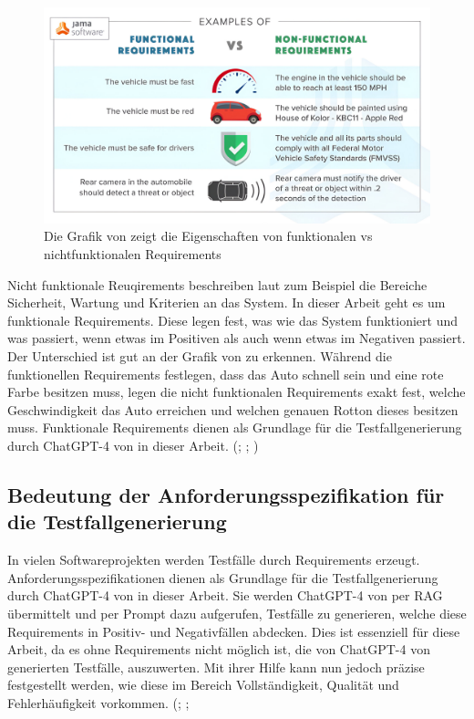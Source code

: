 \documentclass[12pt,toc=bib,toc=listof]{scrreprt}
\begin{document}
\begin{figure}[H]
    \centering
    \includegraphics[width=0.75\linewidth]{./Bilder/Jama Software_Eigenschaften von funktionalen vs nichtfunktionalen Requirements.jpeg}
    \caption{Die Grafik von \textcite{JamaSoftware2024} zeigt die Eigenschaften von funktionalen vs nichtfunktionalen Requirements}
    \label{fig:enter-label}
\end{figure}
\noindent Nicht funktionale Reuqirements beschreiben laut \textcite{Visure2024} zum Beispiel die Bereiche Sicherheit, Wartung und Kriterien an das System. In dieser Arbeit geht es um funktionale Requirements. Diese legen fest, was wie das System funktioniert und was passiert, wenn etwas im Positiven als auch wenn etwas im Negativen passiert. Der Unterschied ist gut an der Grafik von \textcite{JamaSoftware2024} zu erkennen. Während die funktionellen Requirements festlegen, dass das Auto schnell sein und eine rote Farbe besitzen muss, legen die nicht funktionalen Requirements exakt fest, welche Geschwindigkeit das Auto erreichen und welchen genauen Rotton dieses besitzen muss. Funktionale Requirements dienen als Grundlage für die Testfallgenerierung durch ChatGPT-4 von \textcite{OpenAI2025} in dieser Arbeit. (\cite{Aysolmaz2018}; \cite{Barmi2011}; \cite{Mustafa2021})
\newpage

\subsection{Bedeutung der Anforderungsspezifikation für die Testfallgenerierung} %
\label{sec:bedeutungDerAnforderungsspezifikationFürDieTestfallgenerierung}
In vielen Softwareprojekten werden Testfälle durch Requirements erzeugt. Anforderungsspezifikationen dienen als Grundlage für die Testfallgenerierung durch ChatGPT-4 von \textcite{OpenAI2025} in dieser Arbeit. Sie werden ChatGPT-4 von \textcite{OpenAI2025} per RAG übermittelt und per Prompt dazu aufgerufen, Testfälle zu generieren, welche diese Requirements in Positiv- und Negativfällen abdecken. Dies ist essenziell für diese Arbeit, da es ohne Requirements nicht möglich ist, die von ChatGPT-4 von \textcite{OpenAI2025} generierten Testfälle, auszuwerten. Mit ihrer Hilfe kann nun jedoch präzise festgestellt werden, wie diese im Bereich Vollständigkeit, Qualität und Fehlerhäufigkeit vorkommen. (\cite{Aysolmaz2018}; \cite{Barmi2011}; \cite{Mustafa2021}\\
\end{document}
